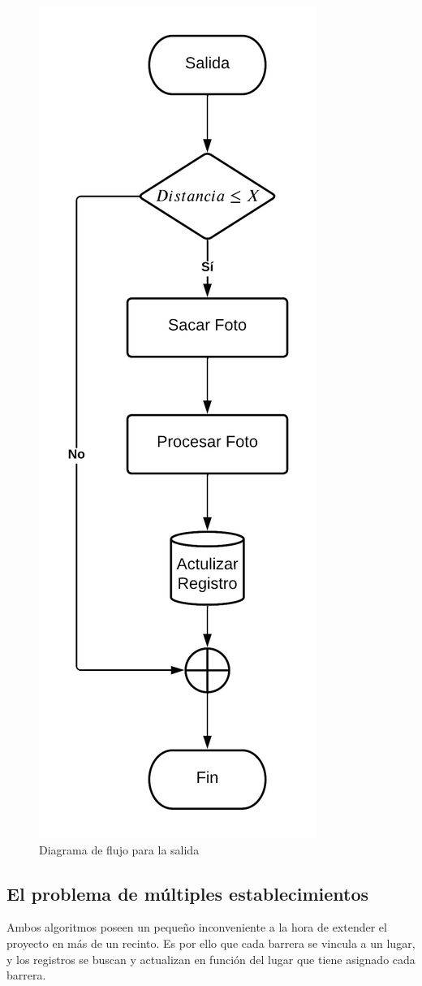 \begin{figure}
    \centering
    \includegraphics[width=.5\textwidth]{imgs/flujo-salida.png}
    \caption{Diagrama de flujo para la salida}
    \label{fig:flujo-salida}
\end{figure}

\subsection{El problema de múltiples establecimientos}

Ambos algoritmos poseen un pequeño inconveniente a la hora de extender el proyecto en más de un recinto. Es por ello que cada barrera se vincula a un lugar, y los registros se buscan y actualizan en función del lugar que tiene asignado cada barrera.

